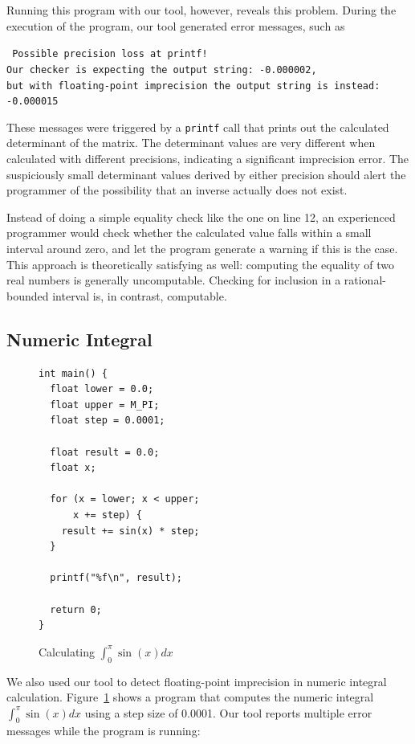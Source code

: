 Running this program with our tool, however, reveals this problem. During the execution of the program, our tool generated error messages, such as

\textcolor{red!70!black} {
{\tt \footnotesize
Possible precision loss at printf!\\
Our checker is expecting the output string: -0.000002,\\
but with floating-point imprecision the output string is instead: -0.000015}
}

These messages were triggered by a {\tt printf} call that prints out the calculated determinant of the matrix. The determinant values are very different when calculated with different precisions, indicating a significant imprecision error. The suspiciously small determinant values derived by either precision should alert the programmer of the possibility that an inverse actually does not exist.

Instead of doing a simple equality check like the one on line 12, an experienced programmer would check whether the calculated value falls within a small interval around zero, and let the program generate a warning if this is the case. This approach is theoretically satisfying as well: computing the equality of two real numbers is generally uncomputable. Checking for inclusion in a rational-bounded interval is, in contrast, computable.

\subsection{Numeric Integral}

\begin{figure}[t!]
\begin{lstlisting}
int main() {
  float lower = 0.0;
  float upper = M_PI;
  float step = 0.0001;

  float result = 0.0;
  float x;

  for (x = lower; x < upper;
      x += step) {
    result += sin(x) * step;
  }

  printf("%f\n", result);

  return 0;
}
\end{lstlisting}
\caption{Calculating $\int_{0}^{\pi}\sin(x)dx$}
\label{fig:numericint}
\end{figure}

We also used our tool to detect floating-point imprecision in numeric integral calculation. Figure~\ref{fig:numericint} shows a program that computes the numeric integral $\int_{0}^{\pi}\sin(x)dx$ using a step size of 0.0001. Our tool reports multiple error messages while the program is running:

